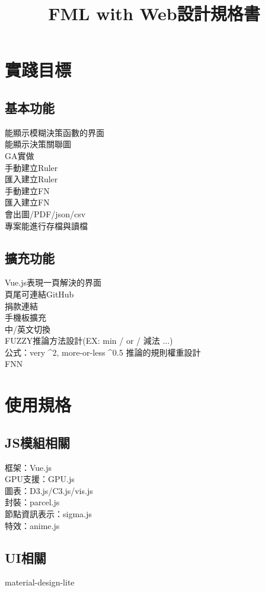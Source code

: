 \documentclass[UTF8]{article}
\title{FML with Web設計規格書}
\begin{document}
	
  \section{實踐目標}
		\subsection{基本功能}
			能顯示模糊決策函數的界面 \\
			能顯示決策關聯圖 \\
			GA實做 \\
			手動建立Ruler \\
			匯入建立Ruler \\
			手動建立FN \\
			匯入建立FN \\
			會出圖/PDF/json/csv \\
			專案能進行存檔與讀檔 \\

		\subsection{擴充功能}
			Vue.js表現一頁解決的界面 \\
			頁尾可連結GitHub \\
			捐款連結 \\
			手機板擴充 \\
			中/英文切換 \\
			FUZZY推論方法設計(EX: min / or / 減法 ...) \\
			公式：very ^2, more-or-less ^0.5
			推論的規則權重設計 \\
			FNN \\

  \section{使用規格}
		\subsection{JS模組相關}
		框架：Vue.js \\
		GPU支援：GPU.js \\
		圖表：D3.js/C3.js/vis.js \\
		封裝：parcel.js \\
		節點資訊表示：sigma.js \\
		特效：anime.js

		\subsection{UI相關}
		material-design-lite \\
\end{document}
